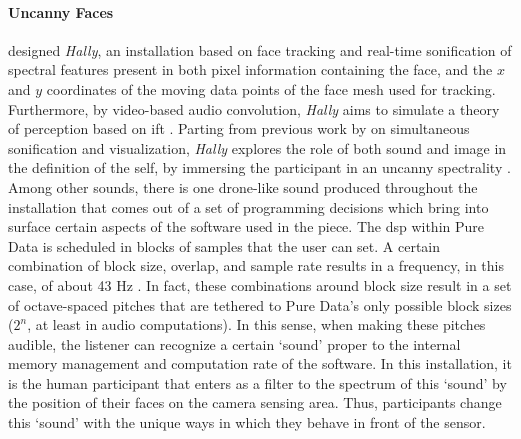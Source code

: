 \documentclass[
]{book}
\begin{document}
\paragraph{Uncanny Faces}
\label{hearing_the_self}
\textcite{fdch/installation/spectral} designed \textit{Hally}, an installation based on face tracking and real-time sonification of spectral features present in both pixel information containing the face, and the $x$ and $y$ coordinates of the moving data points of the face mesh used for tracking. Furthermore, by video-based audio convolution, \textit{Hally} aims to simulate a theory of perception based on \gls{ift} \parencite{connes:shapes}. Parting from previous work by \textcite{Sch07:How} on simultaneous sonification and visualization, \textit{Hally} explores the role of both sound and image in the definition of the self, by immersing the participant in an uncanny spectrality \parencite{fdch/papers/spectral}. Among other sounds, there is one drone-like sound produced throughout the installation that comes out of a set of programming decisions which bring into surface certain aspects of the software used in the piece. The \gls{dsp} within Pure Data is scheduled in blocks of samples that the user can set. A certain combination of block size, overlap, and sample rate results in a frequency, in this case, of about 43 Hz \parencite[3]{fdch/installation/spectral}. In fact, these combinations around block size result in a set of octave-spaced pitches that are tethered to Pure Data's only possible block sizes ($2^n$, at least in audio computations). In this sense, when making these pitches audible, the listener can recognize a certain `sound' proper to the internal memory management and computation rate of the software. In this installation, it is the human participant that enters as a filter to the spectrum of this `sound' by the position of their faces on the camera sensing area. Thus, participants change this `sound' with the unique ways in which they behave in front of the sensor.


% 
% 
\end{document}
